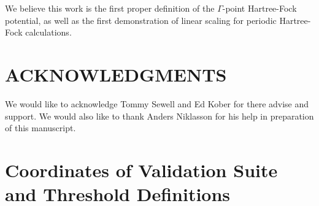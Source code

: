 \documentclass[prb,aps,nobibnotes,twocolumn,doublespace,twocolumngrid,superbib]{revtex4}
\begin{document}
We believe this work is the first proper definition of the $\Gamma$-point
Hartree-Fock potential, as well as the first demonstration of linear scaling
for periodic Hartree-Fock calculations.


\section*{ACKNOWLEDGMENTS}

We would like to acknowledge Tommy Sewell and Ed Kober for there advise
and support. We would also like to thank Anders Niklasson for his help
in preparation of this manuscript. 


 
 


\appendix

\section{Coordinates of Validation Suite and Threshold Definitions}\label{Coordinates}
%
%
%
\begin{table}[p]
\caption{Fractional coordinates for the triclinic 2 atom unit cell of MgO, cooresponding to the 
         calculations reported in Table~\ref{MgOTable}.  Length of the unit cell is 
         $a=b=c=2.977776807$\AA, with angles $\alpha=\beta=\gamma=60^\circ$.}
\end{table}
\end{document}
